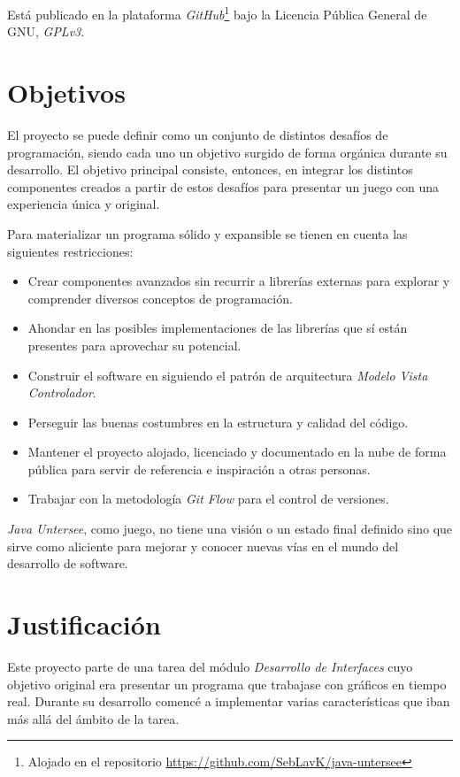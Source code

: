 \documentclass[a4paper,
	11pt,
	parskip=full,
	bibliography=totoc,
	twoside
	]{scrartcl}
\let\oldsection\section
\def\section{\cleardoubleoddpage\oldsection}
\begin{document}
	Está publicado en la plataforma \textit{GitHub}\footnote{Alojado en el repositorio \href{https://github.com/SebLavK/java-untersee}{https://github.com/SebLavK/java-untersee}} bajo la Licencia Pública General de GNU, \textit{GPLv3}.

\section{Objetivos}
\label{sec:objetivos}
	El proyecto se puede definir como un conjunto de distintos desafíos de programación, siendo cada uno un objetivo surgido de forma orgánica durante su desarrollo. El objetivo principal consiste, entonces, en integrar los distintos componentes creados a partir de estos desafíos para presentar un juego con una experiencia única y original.
	
	Para materializar un programa sólido y expansible se tienen en cuenta las siguientes restricciones:
	\begin{itemize}[noitemsep]
		\item Crear componentes avanzados sin recurrir a librerías externas para explorar y comprender diversos conceptos de programación.
		\item Ahondar en las posibles implementaciones de las librerías que sí están presentes para aprovechar su potencial.
		\item Construir el software en siguiendo el patrón de arquitectura \textit{Modelo Vista Controlador}.
		\item Perseguir las buenas costumbres en la estructura y calidad del código.
		\item Mantener el proyecto alojado, licenciado y documentado en la nube de forma pública para servir de referencia e inspiración a otras personas.
		\item Trabajar con la metodología \textit{Git Flow} para el control de versiones.
	\end{itemize}
	
	\textit{Java Untersee}, como juego, no tiene una visión o un estado final definido sino que sirve como aliciente para mejorar y conocer nuevas vías en el mundo del desarrollo de software.

\section{Justificación}
\label{sec:justificacion}
	Este proyecto parte de una tarea del módulo \textit{Desarrollo de Interfaces} cuyo objetivo original era presentar un programa que trabajase con gráficos en tiempo real. Durante su desarrollo comencé a implementar varias características que iban más allá del ámbito de la tarea.
	
\end{document}
